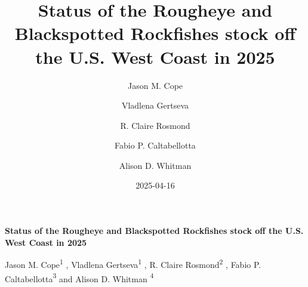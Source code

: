 \documentclass[
]{scrartcl}
\title{Status of the Rougheye and Blackspotted Rockfishes stock off the
U.S. West Coast in 2025}
\author{Jason M. Cope \and Vladlena Gertseva \and R. Claire
Rosmond \and Fabio P. Caltabellotta \and Alison D. Whitman}
\date{2025-04-16}
\begin{document}
  \begin{titlepage}

  \begin{minipage}[b][\textheight][s]{\textwidth}


  \raggedright




  {\huge\bfseries\nohyphens{Status of the Rougheye and Blackspotted
  Rockfishes stock off the U.S. West Coast in 2025}}\\[1\baselineskip]



  \vspace{1\baselineskip}


  \vspace{1\baselineskip}

   {\large{Jason M. Cope}}{\textsuperscript{1}}%
  ,
   {\large{Vladlena Gertseva}}{\textsuperscript{1}}%
  ,
   {\large{R. Claire Rosmond}}{\textsuperscript{2}}%
  ,
   {\large{Fabio P. Caltabellotta}}{\textsuperscript{3}}%
  { and \large{Alison D. Whitman}}%
  {\textsuperscript{4}}%



  \vspace{2\baselineskip}


\end{minipage}
\end{titlepage}
\end{document}
